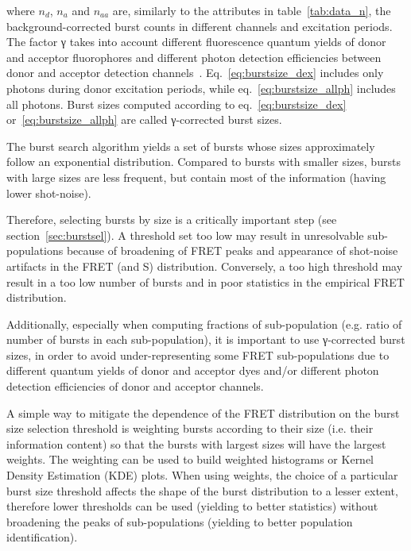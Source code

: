 \noindent where $n_d$, $n_a$ and $n_{aa}$ are, similarly to the attributes
in table~\ref{tab:data_n}, the background-corrected
burst counts in different channels and excitation periods.
The factor γ takes into account
different fluorescence quantum yields of donor and acceptor fluorophores and different
photon detection efficiencies between donor and acceptor detection
channels~\cite{Lee_2005}.
Eq.~\ref{eq:burstsize_dex} includes only photons during donor excitation periods,
while eq.~\ref{eq:burstsize_allph} includes all photons.
Burst sizes computed according to eq.~\ref{eq:burstsize_dex}
or~\ref{eq:burstsize_allph} are called γ-corrected burst sizes.

The burst search algorithm yields a set of bursts whose sizes
approximately follow an exponential distribution.
Compared to bursts with smaller sizes, bursts with large sizes are less frequent, 
but contain most of the information (having lower shot-noise).

Therefore, selecting bursts by size is a critically important step (see section~\ref{sec:burstsel}).
A threshold set too low may result in unresolvable sub-populations
because of broadening of FRET peaks and appearance of shot-noise artifacts
in the FRET (and S) distribution.
Conversely, a too high threshold may result in a too low number of bursts
and in poor statistics in the empirical FRET distribution.

Additionally, especially when computing fractions of sub-population 
(e.g. ratio of number of bursts in each sub-population),
it is important to use γ-corrected burst sizes,
in order to avoid under-representing some FRET sub-populations
due to different quantum yields of donor and acceptor dyes and/or
different photon detection efficiencies of donor and acceptor channels.

A simple way to mitigate the dependence of the FRET distribution on 
the burst size selection threshold is weighting bursts according to their size 
(i.e. their information content)
so that the bursts with largest sizes will have the largest weights.
The weighting can be used to build weighted histograms or Kernel Density
Estimation (KDE) plots. When using weights, the choice of a particular
burst size threshold affects the shape of the burst distribution to a lesser extent,
therefore lower thresholds can be used (yielding to better statistics)
without broadening the peaks of sub-populations (yielding to better
population identification).

